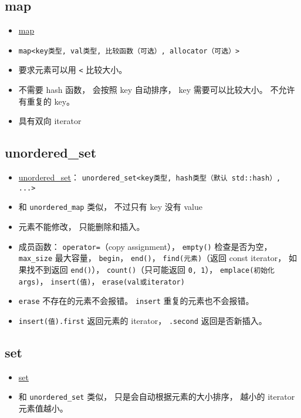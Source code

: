 \subsection{map}
\begin{itemize}
\item \href{https://cplusplus.com/reference/map/map/}{map}
\item \verb`map<key类型, val类型, 比较函数（可选）, allocator（可选）>`
\item 要求元素可以用 \verb`<` 比较大小。
\item 不需要 hash 函数， 会按照 key 自动排序， key 需要可以比较大小。 不允许有重复的 key。
\item 具有双向 iterator
\end{itemize}

\subsection{unordered\_set}
\begin{itemize}
\item \href{https://cplusplus.com/reference/unordered_set/unordered_set/}{unordered\_set}： \verb`unordered_set<key类型, hash类型（默认 std::hash）, ...>`
\item 和 \verb`unordered_map` 类似， 不过只有 key 没有 value
\item 元素不能修改， 只能删除和插入。
\item 成员函数： \verb`operator=`（copy assignment）， \verb`empty()` 检查是否为空， \verb`max_size` 最大容量， \verb`begin`， \verb`end()`， \verb`find(元素)`（返回 const iterator， 如果找不到返回 \verb`end()`）， \verb`count()`（只可能返回 \verb`0, 1`）， \verb`emplace(初始化args)`， \verb`insert(值)`， \verb`erase(val或iterator)`
\item \verb`erase` 不存在的元素不会报错。 \verb`insert` 重复的元素也不会报错。
\item \verb`insert(值).first` 返回元素的 iterator， \verb`.second` 返回是否新插入。
\end{itemize}

\subsection{set}
\begin{itemize}
\item \href{https://en.cppreference.com/w/cpp/container/set}{set}
\item 和 \verb`unordered_set` 类似， 只是会自动根据元素的大小排序， 越小的 iterator 元素值越小。
\end{itemize}

